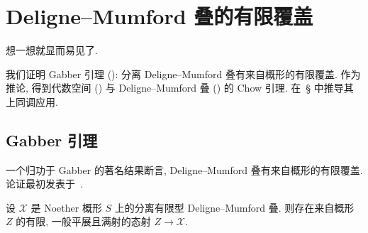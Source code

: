 \section{Deligne--Mumford 叠的有限覆盖}\label{src:5.6}
\begin{epigraph}
想一想就显而易见了.
\end{epigraph}
我们证明 Gabber 引理 (): 分离 Deligne--Mumford 叠有来自概形的有限覆盖. 作为推论, 得到代数空间 () 与 Deligne--Mumford 叠 () 的 Chow 引理. 在~\S{} 中推导其上同调应用.

\subsection{Gabber 引理}\label{src:5.6.1-subsection}
一个归功于 Gabber 的著名结果断言, Deligne--Mumford 叠有来自概形的有限覆盖. 论证最初发表于~\cite{Del85,Vis89}.
\begin{theorem}[Gabber 引理]\label{src:5.6.1}
设 $\mathcal X$ 是 Noether 概形 $S$ 上的分离有限型 Deligne--Mumford 叠. 则存在来自概形 $Z$ 的有限, 一般平展且满射的态射 $Z\to\mathcal X$.
\end{theorem}
